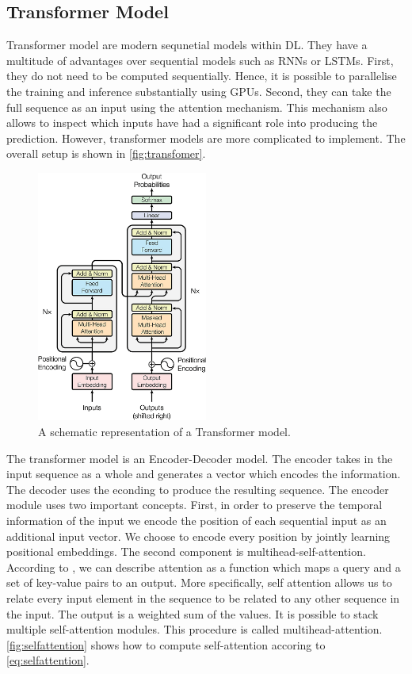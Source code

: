 \documentclass[./../../paper.tex]{subfiles}
\begin{document}
\subsection{Transformer Model}
Transformer model are modern sequnetial models within \gls{DL}. They have a multitude of advantages over sequential models such as \glspl{RNN} or \glspl{LSTM}\autocite{vaswani_AttentionAllYou_2017}. First, they do not need to be computed sequentially. Hence, it is possible to parallelise the training and inference substantially using GPUs. Second, they can take the full sequence as an input using the attention mechanism. This mechanism also allows to inspect which inputs have had a significant role into producing the prediction. However, transformer models are more complicated to implement. The overall setup is shown in \autoref{fig:transfomer}\autocite{vaswani_AttentionAllYou_2017}.

\begin{figure}[htb]
    \centering
    \includegraphics[width=0.5\textwidth]{figures/transformer.png}
    \caption{A schematic representation of a Transformer model.}
    \label{fig:transformer}
\end{figure}

The transformer model is an Encoder-Decoder model. The encoder takes in the input sequence as a whole and generates a vector which encodes the information. The decoder uses the econding to produce the resulting sequence. The encoder module uses two important concepts. First, in order to preserve the temporal information of the input we encode the position of each sequential input as an additional input vector. We choose to encode every position by jointly learning  positional embeddings. The second component is multihead-self-attention. According to \citeauthor{vaswani_AttentionAllYou_2017}, we can describe attention as a function which maps a query and a set of key-value pairs to an output. More specifically, self attention allows us to relate every input element in the sequence to be related to any other sequence in the input. The output is a weighted sum of the values. It is possible to stack multiple self-attention modules. This procedure is called multihead-attention. \autoref{fig:selfattention} shows how to compute self-attention accoring to \autoref{eq:selfattention}\autocite{vaswani_AttentionAllYou_2017}. 
\end{document}
